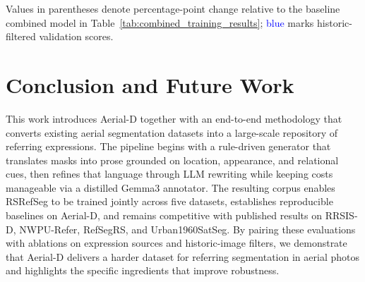 \documentclass[journal]{IEEEtran}
\begin{document}
\begin{table}[t]
\centering
\caption{Historic-filter ablations for the RSRefSeg-b base architecture. Each row lists the clean score followed by the historic-filter variant (blue) with percentage-point deltas relative to Table~\ref{tab:combined_training_results}; the second row also removes Urban1960SatSeg supervision.}
\label{tab:historic_ablation_results}
\renewcommand{\arraystretch}{1.1}
\renewcommand{\arraystretch}{1}
\end{table}

Values in parentheses denote percentage-point change relative to the baseline combined model in Table~\ref{tab:combined_training_results}; \textcolor{blue}{blue} marks historic-filtered validation scores.

\section{Conclusion and Future Work}
\label{sec:conclusion}

This work introduces Aerial-D together with an end-to-end methodology that converts existing aerial segmentation datasets into a large-scale repository of referring expressions. The pipeline begins with a rule-driven generator that translates masks into prose grounded on location, appearance, and relational cues, then refines that language through LLM rewriting while keeping costs manageable via a distilled Gemma3 annotator. The resulting corpus enables RSRefSeg to be trained jointly across five datasets, establishes reproducible baselines on Aerial-D, and remains competitive with published results on RRSIS-D, NWPU-Refer, RefSegRS, and Urban1960SatSeg. By pairing these evaluations with ablations on expression sources and historic-image filters, we demonstrate that Aerial-D delivers a harder dataset for referring segmentation in aerial photos and highlights the specific ingredients that improve robustness.
\end{document}

